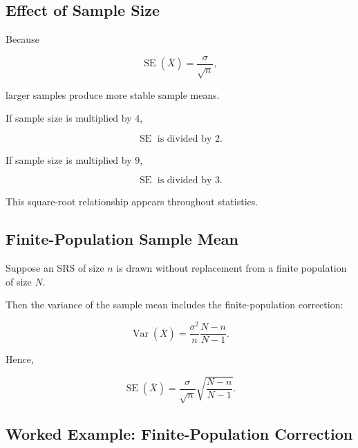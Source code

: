 \subsection{Effect of Sample Size}
\label{subsec:sample-size-se}

Because

\[
\operatorname{SE}(\overline{X})
=
\frac{\sigma}{\sqrt{n}},
\]

larger samples produce more stable sample means.

If sample size is multiplied by \(4\),

\[
\boxed{
\operatorname{SE}
\text{ is divided by }2.
}
\]

If sample size is multiplied by \(9\),

\[
\boxed{
\operatorname{SE}
\text{ is divided by }3.
}
\]

This square-root relationship appears throughout statistics.

\subsection{Finite-Population Sample Mean}
\label{subsec:finite-population-sample-mean}

Suppose an SRS of size \(n\) is drawn without replacement from a finite
population of size \(N\).

Then the variance of the sample mean includes the finite-population
correction:

\[
\boxed{
\operatorname{Var}(\overline{X})
=
\frac{\sigma^2}{n}
\frac{N-n}{N-1}.
}
\]

Hence,

\[
\boxed{
\operatorname{SE}(\overline{X})
=
\frac{\sigma}{\sqrt{n}}
\sqrt{
\frac{N-n}{N-1}
}.
}
\]

\subsection{Worked Example: Finite-Population Correction}
\label{subsec:worked-fpc-sampling-distribution}

